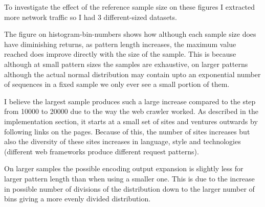 \documentclass[ %
                    author={Samuel Russell},
                supervisor={Prof. Bogdan Warinschi},
                    degree={MEng},
                     title={Innocuous Ciphertexts},
                  subtitle={The DE-CENSOR Scheme},
                      type={research},
                      year={2018} ]{dissertation}
\begin{document}
\begin{figure}
\centering

\end{figure}

To investigate the effect of the reference sample size on these figures I extracted more network traffic so I had 3 different-sized datasets.

The figure on histogram-bin-numbers shows how although each sample size does have diminishing returns, as pattern length increases, the maximum value reached does improve directly with the size of the sample. This is because although at small pattern sizes the samples are exhaustive, on larger patterns although the actual normal distribution may contain upto an exponential number of sequences in a fixed sample we only ever see a small portion of them. 

I believe the largest sample produces such a large increase compared to the step from 10000 to 20000 due to the way the web crawler worked.
As described in the implementation section, it starts at a small set of sites and ventures outwards by following links on the pages.
Because of this, the number of sites increases but also the diversity of these sites increases in language, style and technologies (different web frameworks produce different request patterns).

On larger samples the possible encoding output expansion is slightly less for larger pattern length than when using a smaller one. This is due to the increase in possible number of divisions of the distribution down to the larger number of bins giving a more evenly divided distribution.
\end{document}
